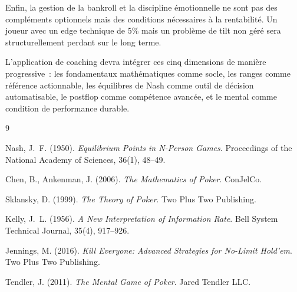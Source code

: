 \documentclass[a4paper,11pt]{article}
\begin{document}
Enfin, la gestion de la bankroll et la discipline \'emotionnelle ne sont pas des compl\'ements optionnels mais des conditions n\'ecessaires \`a la rentabilit\'e. Un joueur avec un edge technique de 5\% mais un probl\`eme de tilt non g\'er\'e sera structurellement perdant sur le long terme.

L'application de coaching devra int\'egrer ces cinq dimensions de mani\`ere progressive~: les fondamentaux math\'ematiques comme socle, les ranges comme r\'ef\'erence actionnable, les \'equilibres de Nash comme outil de d\'ecision automatisable, le postflop comme comp\'etence avanc\'ee, et le mental comme condition de performance durable.


\newpage
\begin{thebibliography}{9}

Nash, J.~F. (1950). \textit{Equilibrium Points in N-Person Games}. Proceedings of the National Academy of Sciences, 36(1), 48--49.

Chen, B., Ankenman, J. (2006). \textit{The Mathematics of Poker}. ConJelCo.

Sklansky, D. (1999). \textit{The Theory of Poker}. Two Plus Two Publishing.

Kelly, J.~L. (1956). \textit{A New Interpretation of Information Rate}. Bell System Technical Journal, 35(4), 917--926.

Jennings, M. (2016). \textit{Kill Everyone: Advanced Strategies for No-Limit Hold'em}. Two Plus Two Publishing.

Tendler, J. (2011). \textit{The Mental Game of Poker}. Jared Tendler LLC.

\end{thebibliography}
\end{document}
